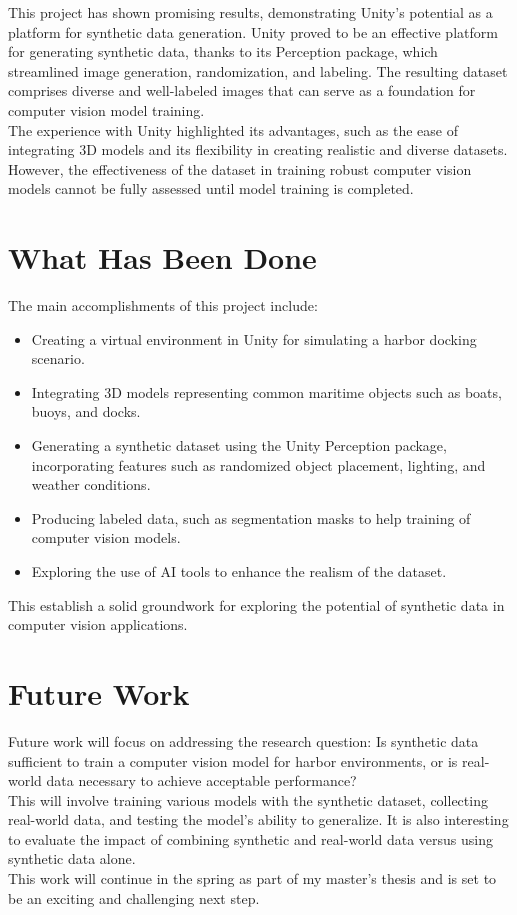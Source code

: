 
This project has shown promising results, demonstrating Unity's potential as a platform for synthetic data generation. Unity proved to be an effective platform for generating synthetic data, thanks to its Perception package, which streamlined image generation, randomization, and labeling. The resulting dataset comprises diverse and well-labeled images that can serve as a foundation for computer vision model training.\\

\noindent The experience with Unity highlighted its advantages, such as the ease of integrating 3D models and its flexibility in creating realistic and diverse datasets. However, the effectiveness of the dataset in training robust computer vision models cannot be fully assessed until model training is completed.


\section{What Has Been Done}
The main accomplishments of this project include: 
\begin{itemize} 
\item Creating a virtual environment in Unity for simulating a harbor docking scenario. 
\item Integrating 3D models representing common maritime objects such as boats, buoys, and docks. 
\item Generating a synthetic dataset using the Unity Perception package, incorporating features such as randomized object placement, lighting, and weather conditions. 
\item Producing labeled data, such as segmentation masks to help training of computer vision models. 
\item Exploring the use of AI tools to enhance the realism of the dataset. 
\end{itemize}
  
\noindent This establish a solid groundwork for exploring the potential of synthetic data in computer vision applications.

\section{Future Work}
Future work will focus on addressing the research question: Is synthetic data sufficient to train a computer vision model for harbor environments, or is real-world data necessary to achieve acceptable performance?\\

\noindent This will involve training various models with the synthetic dataset, collecting real-world data, and testing the model's ability to generalize. It is also interesting to evaluate the impact of combining synthetic and real-world data versus using synthetic data alone.\\

\noindent This work will continue in the spring as part of my master's thesis and is set to be an exciting and challenging next step.
